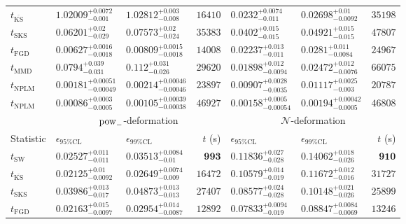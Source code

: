 \begin{tabular}{l|llr|llr}
	$t_{\overline{\mathrm{KS}}}$ & $1.02009_{-0.001}^{+0.0072}$ & $1.02812_{-0.008}^{+0.003}$ & $16410$ & $0.0232_{-0.011}^{+0.0074}$ & $0.02698_{-0.0092}^{+0.01}$ & $35198$ \\
	$t_{\mathrm{SKS}}$ & $0.06201_{-0.029}^{+0.02}$ & $0.07573_{-0.024}^{+0.02}$ & $35383$ & $0.0402_{-0.015}^{+0.015}$ & $0.04921_{-0.015}^{+0.015}$ & $47807$ \\
	$t_{\mathrm{FGD}}$ & ${\mathbf{0.00627_{-0.0018}^{+0.0016}}}$ & ${\mathbf{0.00809_{-0.0018}^{+0.0015}}}$ & $14008$ & $0.02237_{-0.011}^{+0.013}$ & $0.0281_{-0.0084}^{+0.011}$ & $24967$ \\
	$t_{\mathrm{MMD}}$ & $0.0794_{-0.031}^{+0.039}$ & $0.112_{-0.026}^{+0.031}$ & $29620$ & ${\mathbf{0.01898_{-0.0094}^{+0.012}}}$ & ${\mathbf{0.02472_{-0.0076}^{+0.012}}}$ & $66075$ \\
\rowcolor{red!35}	$t_{\mathrm{NPLM}}$ & $0.00181_{-0.00049}^{+0.00051}$ & $0.00214_{-0.00046}^{+0.00046}$ & $23897$ & $0.00907_{-0.0035}^{+0.0028}$ & $0.01117_{-0.003}^{+0.0025}$ & $20787$ \\
\rowcolor{blue!35}	$t_{\mathrm{NPLM}}$ & $0.00086_{-0.0005}^{+0.0003}$ & $0.00105_{-0.00038}^{+0.00039}$ & $46927$ & $0.00158_{-0.00054}^{+0.0005}$ & $0.00194_{-0.0005}^{+0.00042}$ & $46808$ \\
	\toprule
	\multicolumn{1}{c}{} & \multicolumn{3}{c}{$\rm{pow}_{-}$-deformation} & \multicolumn{3}{c}{$\mathcal{N}$-deformation} \\
Statistic & $\epsilon_{95\%\mathrm{CL}}$ & $\epsilon_{99\%\mathrm{CL}}$ & $t$ (s) & $\epsilon_{95\%\mathrm{CL}}$ & $\epsilon_{99\%\mathrm{CL}}$ & $t$ (s) \\
	\midrule
	$t_{\mathrm{SW}}$ & $0.02527_{-0.011}^{+0.011}$ & $0.03513_{-0.01}^{+0.0084}$ & ${\mathbf{993}}$ & $0.11836_{-0.028}^{+0.027}$ & $0.14062_{-0.026}^{+0.018}$ & ${\mathbf{910}}$ \\
	$t_{\overline{\mathrm{KS}}}$ & ${\mathbf{0.02125_{-0.0092}^{+0.01}}}$ & ${\mathbf{0.02649_{-0.009}^{+0.0074}}}$ & $16472$ & $0.10579_{-0.019}^{+0.014}$ & $0.11672_{-0.016}^{+0.012}$ & $31727$ \\
	$t_{\mathrm{SKS}}$ & $0.03986_{-0.017}^{+0.013}$ & $0.04873_{-0.013}^{+0.013}$ & $27407$ & $0.08577_{-0.028}^{+0.024}$ & $0.10148_{-0.026}^{+0.021}$ & $25899$ \\
	$t_{\mathrm{FGD}}$ & $0.02163_{-0.0097}^{+0.015}$ & $0.02954_{-0.0087}^{+0.014}$ & $12892$ & ${\mathbf{0.07833_{-0.019}^{+0.0094}}}$ & ${\mathbf{0.08847_{-0.0069}^{+0.0084}}}$ & $13246$ \\

\end{tabular}
